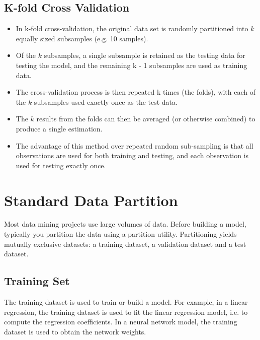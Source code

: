 \documentclass[a4paper,12pt]{article}
\begin{document}
\subsection*{K-fold Cross Validation}
\begin{itemize}
	\item In k-fold cross-validation, the original data set is randomly partitioned into $k$ equally sized subsamples (e.g. 10 samples).
	
	\item Of the $k$ subsamples, a single subsample is retained as the testing data for testing the model, and the remaining k - 1 subsamples are used as training data. 
	\item The cross-validation process is then repeated k times (the folds), with each of the $k$ subsamples used exactly once as the test data. \item The $k$ results from the folds can then be averaged (or otherwise combined) to produce a single estimation.
	\item The advantage of this method over repeated random sub-sampling is that all observations are used for both training and testing, and each observation is used for testing exactly once. 
\end{itemize}



\section{Standard Data Partition}


Most data mining projects use large volumes of data. Before building a model, typically you partition the data using a partition utility. Partitioning yields mutually exclusive datasets: a training dataset, a validation dataset and a test dataset.
\subsection*{Training Set}
The training dataset is used to train or build a model. For example, in a linear regression, the training dataset is used to fit the linear regression model, i.e. to compute the regression coefficients. In a neural network model, the training dataset is used to obtain the network weights.
\end{document}
